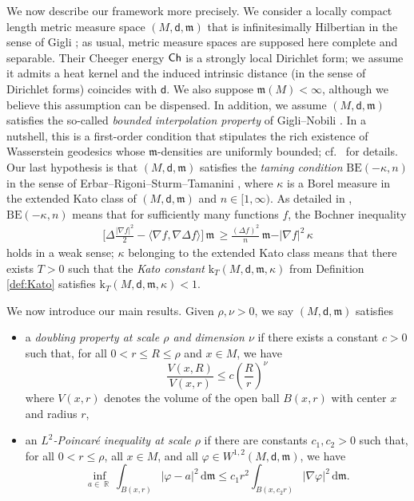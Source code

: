 \documentclass[10pt]{article}
\newcommand{\m}{\mathfrak{m}}
\newcommand{\M}{{\mathit{M}}}
\renewcommand{\d}{\,\mathrm{d}}
\renewcommand{\k}{\mathrm{k}}
\newcommand{\dist}{\mathsf{d}}
\newcommand{\Ch}{{\sf Ch}}
\DeclareMathOperator{\RR}{\mathbb{R}}
\newcommand{\BE}{{\mathrm{BE}}}
\theoremstyle{plain}
\theoremstyle{definition}
\begin{document}
We now describe our framework more precisely. We consider a locally compact length metric measure space $(\M,\dist,\m)$ that is infinitesimally Hilbertian in the sense of Gigli \cite{Gigli15}; as usual, metric measure spaces are supposed here complete and separable. Their Cheeger energy $\Ch$ is a strongly local Dirichlet form; we assume it admits a heat kernel and the induced intrinsic distance (in the sense of Dirichlet forms) coincides with $\dist$. We also suppose $\m(M) < \infty$, although we believe this assumption can be dispensed. In addition, we assume $(\M,\dist,\m)$ satisfies the so-called \emph{bounded interpolation property} of Gigli--Nobili \cite{GigliNobili}. In a nutshell, this is a first-order condition that stipulates the rich existence of Wasserstein geodesics whose $\m$-densities are uniformly bounded; cf.~ for details. Our last hypothesis is that $(M,\dist,\m)$ satisfies the  \emph{taming condition} $\BE(-\kappa,n)$ in the sense of Erbar--Rigoni--Sturm--Tamanini \cite{ERST}, where $\kappa$ is a Borel measure in the extended Kato class of $(\M,\dist,\m)$ and $n\in [1,\infty)$. As detailed in , $\BE(-\kappa,n)$ means that for sufficiently many functions $f$, the Bochner inequality 
\begin{align*}
    \Big[\Delta\frac{\vert \nabla f\vert^2}{2} - \langle\nabla f,\nabla\Delta f\rangle\Big]\,\m\, \geq \frac{(\Delta f)^2}{n}\,\m - \vert\nabla f\vert^2\,\kappa
\end{align*}
holds in a weak sense; $\kappa$ belonging to the extended Kato class means that there exists $T>0$ such that the \emph{Kato constant} $\k_T(\M,\dist,\m,\kappa)$ from Definition \ref{def:Kato} satisfies $\k_T(\M,\dist,\m,\kappa)<1$.

We now introduce our main results. Given $\rho,\nu>0$, we say $(\M,\dist,\m)$ satisfies
\begin{itemize}
    \item a \emph{doubling property at scale $\rho$ and dimension $\nu$} if there exists a constant $c>0$ such that, for all $0<r\leq R\leq \rho $ and $x\in \M$, we have
    \[
    \frac{V(x,R)}{V(x,r)}\leq c\left(\frac{R}{r}\right)^{\nu}
    \]
    where $V(x,r)$ denotes the volume of the open ball $B(x,r)$ with center $x$ and radius $r$,
    \item an \emph{$L^2$-Poincaré inequality at scale $\rho$} if there are constants $c_1,c_2>0$ such that, for all $0<r\leq \rho$, all $x\in \M$, and all $\varphi\in W^{1,2}(\M,\dist,\m)$, we have 
    \[
    \inf_{a\in\RR}\int_{B(x,r)}|\varphi-a|^2\d\m\leq c_1r^2\int_{B(x,c_2 r)}|\nabla\varphi|^2\d\m.
    \]
    \end{itemize}
\end{document}
